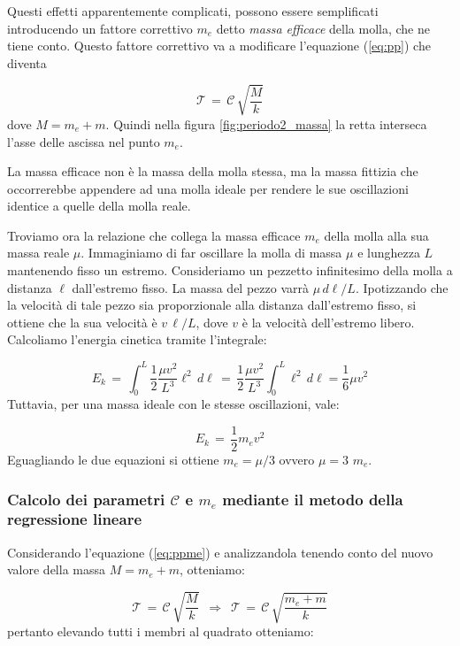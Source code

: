 Questi effetti apparentemente complicati, possono essere semplificati introducendo un fattore correttivo $m_e$ detto
\emph{massa efficace} della molla, che ne tiene conto. Questo fattore correttivo va a modificare l'equazione (\ref{eq:pp}) che diventa

\begin{equation}
    \mathcal{T} \, = \, \mathcal{C} \, \sqrt{\frac{M}{k}}
    \label{eq:ppme}
\end{equation}
%
dove $M = m_e + m$. Quindi nella figura \ref{fig:periodo2_massa} la retta interseca l'asse delle ascissa
nel punto $m_e$.

La massa efficace non è la massa della molla stessa, ma la massa fittizia che occorrerebbe
appendere ad una molla ideale per rendere le sue oscillazioni identice a quelle della molla reale.

Troviamo ora la relazione che collega la massa efficace $m_e$ della molla alla sua massa reale $\mu$.
Immaginiamo di far oscillare la molla di massa $\mu$ e lunghezza $L$ mantenendo fisso un estremo.
Consideriamo un pezzetto infinitesimo della molla a distanza $\ell$ dall'estremo fisso. La massa del pezzo
varrà $\mu \, d\ell / L$. Ipotizzando che la velocità di tale pezzo sia proporzionale alla distanza dall'estremo
fisso, si ottiene che la sua velocità è $v \, \ell / L$, dove $v$ è la velocità dell'estremo libero.
Calcoliamo l'energia cinetica tramite l'integrale:

\begin{equation*}
    E_k \, = \, \int_0^L \frac{1}{2} \frac{\mu v^2}{L^3} \ell^2 \, d\ell \, = \,
    \frac{1}{2} \frac{\mu v^2}{L^3} \int_0^L \ell^2 \, d\ell = \frac{1}{6} \mu v^2
\end{equation*}
%
Tuttavia, per una massa ideale con le stesse oscillazioni, vale:

\begin{equation*}
    E_k \, = \, \frac{1}{2} m_e v^2
\end{equation*}
%
Eguagliando le due equazioni si ottiene $m_e = \mu/3$ ovvero $\mu = 3\,\,m_e$. 

\subsubsection{Calcolo dei parametri $\mathcal{C}$ e $m_e$ mediante il metodo della regressione lineare}
Considerando l'equazione (\ref{eq:ppme}) e analizzandola tenendo conto del nuovo valore della massa $M = m_e + m$, otteniamo:

\begin{equation*}
	\mathcal{T} \,=\, \mathcal{C} \, \sqrt{\frac{M}{k}}	\,\,\,\Longrightarrow\,\,\, \mathcal{T} \,=\, \mathcal{C} \, \sqrt{\frac{m_e + m}{k}}
\end{equation*}
%
pertanto elevando tutti i membri al quadrato otteniamo:

